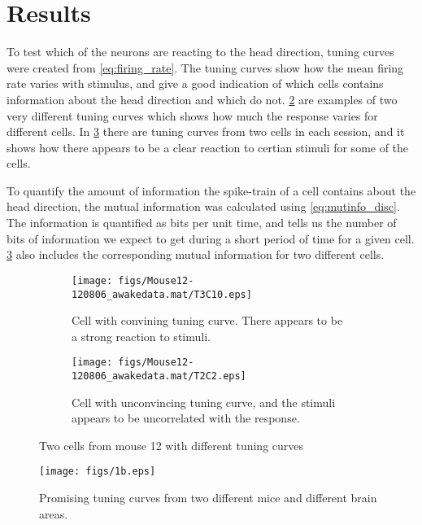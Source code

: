 \section{Results}
To test which of the neurons are reacting to the head direction, tuning curves were created from \cref{eq:firing_rate}. The tuning curves show how the mean firing rate varies with stimulus, and give a good indication of which cells contains information about the head direction and which do not. \cref{fig:1a_two_tuning_curves} are examples of two very different tuning curves which shows how much the response varies for different cells. 
In \cref{fig:1b_convincing_tuning} there are tuning curves from two cells in each session, and it shows how there appears to be a clear reaction to certian stimuli for some of the cells.

To quantify the amount of information the spike-train of a cell contains about the head direction, the mutual information was calculated using \cref{eq:mutinfo_disc}. The information is quantified as bits per unit time, and tells us the number of bits of information we expect to get during a short period of time for a given cell. \cref{fig:1b_convincing_tuning} also includes the corresponding mutual information for two different cells.

\begin{figure}
    \centering
    \begin{subfigure}[b]{0.4\textwidth}
        \texttt{[image: figs/Mouse12-120806\_awakedata.mat/T3C10.eps]}
        \caption{Cell with convining tuning curve. There appears to be a strong reaction to stimuli.}
        \label{fig:1a_high_mut_info}
    \end{subfigure}
    \begin{subfigure}[b]{0.4\textwidth}
        \texttt{[image: figs/Mouse12-120806\_awakedata.mat/T2C2.eps]}
        \caption{Cell with unconvincing tuning curve, and the stimuli appears to be uncorrelated with the response.}
    \end{subfigure}
    \caption{Two cells from mouse 12 with different tuning curves}
    \label{fig:1a_two_tuning_curves}
\end{figure}
\begin{figure}[H]
    \centering
    \texttt{[image: figs/1b.eps]}
    \caption{Promising tuning curves from two different mice and different brain areas. }
    \label{fig:1b_convincing_tuning}
\end{figure}

